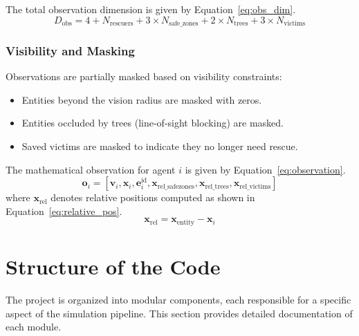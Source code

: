 \documentclass[11pt,a4paper]{article}
\begin{document}
The total observation dimension is given by Equation~\ref{eq:obs_dim}.
\begin{equation}
\label{eq:obs_dim}
D_{\text{obs}} = 4 + N_{\text{rescuers}} + 3 \times N_{\text{safe\_zones}} + 2 \times N_{\text{trees}} + 3 \times N_{\text{victims}}
\end{equation}

\subsubsection{Visibility and Masking}
\label{subsubsec:visibility}

Observations are partially masked based on visibility constraints:
\begin{itemize}
    \item Entities beyond the vision radius are masked with zeros.
    \item Entities occluded by trees (line-of-sight blocking) are masked.
    \item Saved victims are masked to indicate they no longer need rescue.
\end{itemize}

The mathematical observation for agent $i$ is given by Equation~\ref{eq:observation}.
\begin{equation}
\label{eq:observation}
\mathbf{o}_i = [\mathbf{v}_i, \mathbf{x}_i, \mathbf{e}_i^{\text{id}}, \mathbf{x}_{\text{rel\_safezones}}, \mathbf{x}_{\text{rel\_trees}}, \mathbf{x}_{\text{rel\_victims}}]
\end{equation}
where $\mathbf{x}_{\text{rel}}$ denotes relative positions computed as shown in Equation~\ref{eq:relative_pos}.
\begin{equation}
\label{eq:relative_pos}
\mathbf{x}_{\text{rel}} = \mathbf{x}_{\text{entity}} - \mathbf{x}_i
\end{equation}

\section{Structure of the Code}
\label{sec:code_structure}

The project is organized into modular components, each responsible for a specific aspect of the simulation pipeline.
This section provides detailed documentation of each module.

\end{document}
